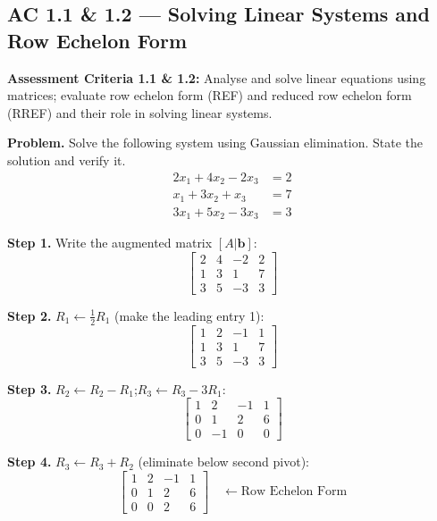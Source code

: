 \documentclass[12pt,a4paper]{article}
\newcommand{\step}[1]{\noindent\textbf{Step #1.}\;}
\begin{document}
	\subsection{AC 1.1 \& 1.2 — Solving Linear Systems and Row Echelon Form}
	
	\begin{tcolorbox}[subtopic]
		\textbf{Assessment Criteria 1.1 \& 1.2:} Analyse and solve linear equations using matrices;
		evaluate row echelon form (REF) and reduced row echelon form (RREF) and their role in solving linear systems.
	\end{tcolorbox}
	
	\begin{tcolorbox}[worked]
		\textbf{Problem.} Solve the following system using Gaussian elimination. State the solution and
		verify it.
		\[
		\begin{aligned}
			2x_1 + 4x_2 - 2x_3 &= 2 \\
			x_1 + 3x_2 +  x_3 &= 7 \\
			3x_1 + 5x_2 - 3x_3 &= 3
		\end{aligned}
		\]
		
		\step{1} Write the augmented matrix $[A|\mathbf{b}]$:
		\[
		\left[\begin{array}{ccc|c}
			2 & 4 & -2 & 2 \\
			1 & 3 &  1 & 7 \\
			3 & 5 & -3 & 3
		\end{array}\right]
		\]
		
		\step{2} $R_1 \leftarrow \tfrac{1}{2}R_1$ (make the leading entry 1):
		\[
		\left[\begin{array}{ccc|c}
			1 & 2 & -1 & 1 \\
			1 & 3 &  1 & 7 \\
			3 & 5 & -3 & 3
		\end{array}\right]
		\]
		
		\step{3} $R_2 \leftarrow R_2 - R_1$;\quad $R_3 \leftarrow R_3 - 3R_1$:
		\[
		\left[\begin{array}{ccc|c}
			1 & 2 & -1 & 1 \\
			0 & 1 &  2 & 6 \\
			0 & -1 &  0 & 0
		\end{array}\right]
		\]
		
		\step{4} $R_3 \leftarrow R_3 + R_2$ (eliminate below second pivot):
		\[
		\left[\begin{array}{ccc|c}
			1 & 2 & -1 & 1 \\
			0 & 1 &  2 & 6 \\
			0 & 0 &  2 & 6
		\end{array}\right]
		\quad \leftarrow \text{Row Echelon Form}
		\]
		

\end{tcolorbox}
\end{document}

